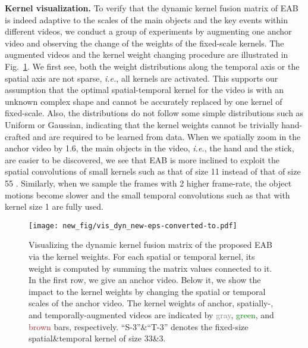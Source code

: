 \textbf{Kernel visualization.}
To verify that the dynamic kernel fusion matrix  of EAB is indeed adaptive to the scales of the main objects and the key events within different videos, we conduct a group of experiments by augmenting one anchor video and observing the change of the weights of the fixed-scale kernels. The augmented videos and the kernel weight changing procedure are illustrated in Fig.~\ref{fig_m}. We first see, both the weight distributions along the temporal axis or the spatial axis are not sparse, \textit{i.e.}, all kernels are activated. This supports our assumption that the optimal spatial-temporal kernel for the video is with an unknown complex shape and cannot be accurately replaced by one kernel of fixed-scale. Also, the distributions do not follow some simple distributions such as Uniform or Gaussian, indicating that the kernel weights cannot be trivially hand-crafted and are required to be learned from data.
When we spatially zoom in the anchor video by 1.6, the main objects in the video, \textit{i.e.}, the hand and the stick, are easier to be discovered, we see that EAB is more inclined to exploit the spatial convolutions of small kernels such as that of size 11 instead of that of size 55
. Similarly, when we sample the frames with 2 higher frame-rate, the object motions become slower and the small temporal convolutions such as that with kernel size 1 are fully used.




\begin{figure}[!t]
	\centering
	\centerline{\texttt{[image: new\_fig/vis\_dyn\_new-eps-converted-to.pdf]}}
	\caption {Visualizing the dynamic kernel fusion matrix  of the proposed EAB via the kernel weights. For each spatial or temporal kernel, its weight is computed by summing the matrix values connected to it.
		In the first row, we give an anchor video.
		Below it, we show the impact to the kernel weights by changing the spatial or temporal scales of the anchor video. The kernel weights of anchor, spatially-, and temporally-augmented videos are indicated by \textcolor{gray}{gray}, \textcolor{green}{green}, and \textcolor{brown}{brown} bars, respectively.
		``S-3''\&``T-3'' denotes the fixed-size spatial\&temporal kernel of size 33\&3.
	}
	\label{fig_m}
\end{figure}




